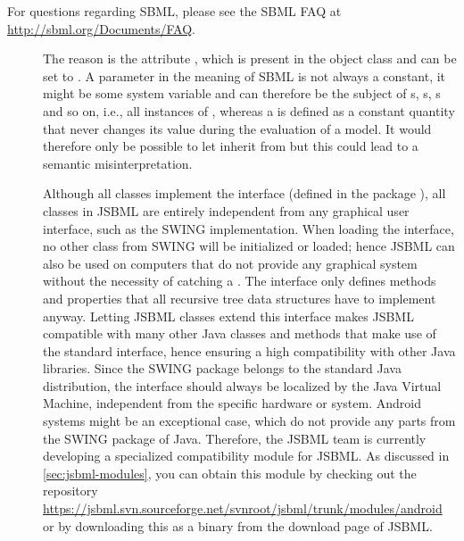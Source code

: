 
For questions regarding SBML, please see the SBML FAQ at
\url{http://sbml.org/Documents/FAQ}.

\begin{description}

\item[\parbox{\textwidth-5pt}{Why does the class \LocalParameter not inherit
    from \Parameter?}]

  The reason is the \Boolean attribute ,%
  which is present
  in the \Parameter object class and can be set to . A parameter in
  the meaning of SBML is not always a constant, it might be some system
  variable \Variable and can therefore be the subject of s,
   \Event{}s, \InitialAssignment{}s and so on, i.e., all
  instances of , whereas a \LocalParameter is defined as a
  constant quantity that never changes its value during the evaluation of a
  model. It would therefore only be possible to let \Parameter
  inherit from \LocalParameter but this could lead to a semantic
  misinterpretation.

\item[\parbox{\textwidth-5pt}{Does JSBML depend on SWING or any particular
    graphical user interface implementation?}]

  Although all classes implement the \TreeNode interface (defined in
  the package ), all classes in JSBML are entirely
  independent from any graphical user interface, such as the
  SWING
  implementation. When loading the \TreeNode interface, no other
  class from SWING will be initialized or loaded; hence JSBML can also be
  used on computers that do not provide any graphical system without the
  necessity of catching a \HeadlessException. The \TreeNode
  interface only defines methods and properties that all recursive tree data
  structures have to implement anyway. Letting JSBML classes extend this
  interface makes JSBML compatible with many other Java classes and methods
  that make use of the standard \TreeNode interface, hence ensuring a
  high compatibility with other Java libraries. Since the SWING package
  belongs to the standard Java distribution, the
  \TreeNode interface should always be localized by the Java Virtual
  Machine, independent from the specific hardware or
  system. Android systems might be an exceptional case, which
  do not provide any parts from the SWING package of Java. Therefore, the
  JSBML team is currently developing a specialized 
  compatibility module for JSBML. As discussed in \vref{sec:jsbml-modules},
  you can obtain this module by checking out the repository
  \url{https://jsbml.svn.sourceforge.net/svnroot/jsbml/trunk/modules/android} or by
  downloading this as a binary from the download page of JSBML.


\end{description}
